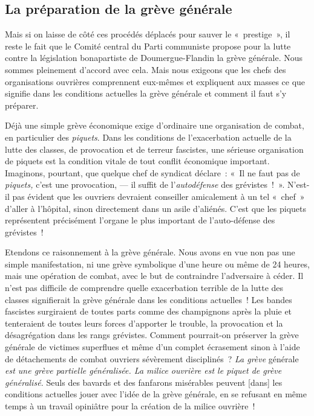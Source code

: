 \documentclass[french,twoside]{book} %
\newcommand\corr[1]{#1}
\begin{document}
\subsection[{La préparation de la grève générale}]{La préparation de la grève générale}
\noindent Mais si on laisse de côté ces procédés déplacés pour sauver le « prestige », il reste le fait que le Comité central  du Parti communiste propose pour la lutte contre la législation bonapartiste de Doumergue-Flandin la grève générale. Nous sommes pleinement d’accord avec cela. Mais nous exigeons que les chefs des organisations ouvrières comprennent eux-mêmes et expliquent aux masses ce que signifie dans les conditions actuelles la grève générale et comment il faut s’y préparer.\par
Déjà une simple grève économique exige d’ordinaire une organisation de combat, en particulier des \emph{piquets}. Dans les conditions de l’exacerbation actuelle de la lutte des classes, de provocation et de terreur fascistes, une sérieuse organisation de piquets est la condition vitale de tout conflit économique important. Imaginons, pourtant, que quelque chef de syndicat déclare : « Il ne faut pas de \emph{piquets,} c’est une provocation, — il suffit de l’\emph{autodéfense} des grévistes ! ». N’est-il pas évident que les ouvriers devraient conseiller amicalement à un tel « chef » d’aller à l’hôpital, sinon directement dans un asile d’aliénés. C’est que les piquets représentent précisément l’organe le plus important de l’auto-défense des grévistes !\par
Etendons ce raisonnement à la grève générale. Nous avons en vue non pas une simple manifestation, ni une grève symbolique d’une heure ou même de 24 heures, mais une opération de combat, avec le but de contraindre l’adversaire à céder. Il n’est pas difficile de comprendre quelle exacerbation terrible de la lutte des classes signifierait la grève générale dans les conditions actuelles ! Les bandes fascistes surgiraient de toutes parts comme des champignons après la pluie et tenteraient de toutes leurs forces d’apporter le trouble, la provocation et la désagrégation dans les rangs grévistes. Comment pourrait-on préserver la grève générale de victimes superflues et même d’un complet écrasement sinon à l’aide de détachements de combat ouvriers sévèrement disciplinés ? \emph{La grève} générale \emph{est une grève partielle généralisée. La milice ouvrière  est le piquet de grève généralisé.} Seuls des bavards et des fanfarons misérables peuvent [{\corr dans}] les conditions actuelles jouer avec l’idée de la grève générale, en se refusant en même temps à un travail opiniâtre pour la création de la milice ouvrière !
\end{document}
